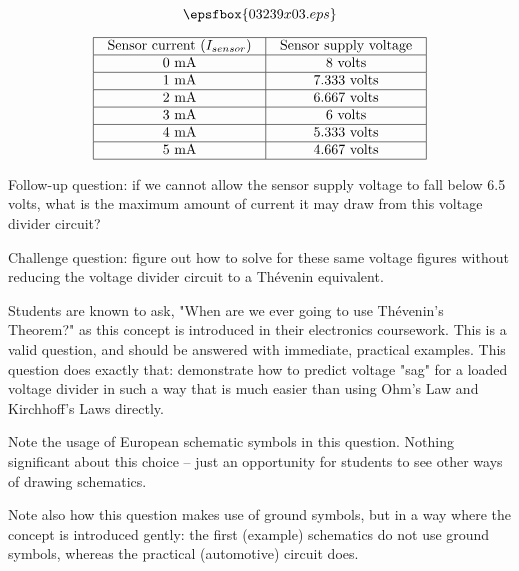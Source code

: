 
$$\epsfbox{03239x03.eps}$$


$$\vbox{\offinterlineskip
\halign{\strut
\vrule \quad\hfil # \ \hfil & 
\vrule \quad\hfil # \ \hfil \vrule \cr
\noalign{\hrule}
%
Sensor current ($I_{sensor}$) & Sensor supply voltage \cr
%
\noalign{\hrule}
%
0 mA & 8 volts \cr
%
\noalign{\hrule}
%
1 mA & 7.333 volts \cr
%
\noalign{\hrule}
%
2 mA & 6.667 volts \cr
%
\noalign{\hrule}
%
3 mA & 6 volts \cr
%
\noalign{\hrule}
%
4 mA & 5.333 volts \cr
%
\noalign{\hrule}
%
5 mA & 4.667 volts \cr
%
\noalign{\hrule}
} %
}$$ %

\vskip 10pt

Follow-up question: if we cannot allow the sensor supply voltage to fall below 6.5 volts, what is the maximum amount of current it may draw from this voltage divider circuit?

\vskip 10pt

Challenge question: figure out how to solve for these same voltage figures without reducing the voltage divider circuit to a Th\'evenin equivalent.







Students are known to ask, "When are we ever going to use Th\'evenin's Theorem?" as this concept is introduced in their electronics coursework.  This is a valid question, and should be answered with immediate, practical examples.  This question does exactly that: demonstrate how to predict voltage "sag" for a loaded voltage divider in such a way that is much easier than using Ohm's Law and Kirchhoff's Laws directly.

Note the usage of European schematic symbols in this question.  Nothing significant about this choice -- just an opportunity for students to see other ways of drawing schematics.

Note also how this question makes use of ground symbols, but in a way where the concept is introduced gently: the first (example) schematics do not use ground symbols, whereas the practical (automotive) circuit does.




